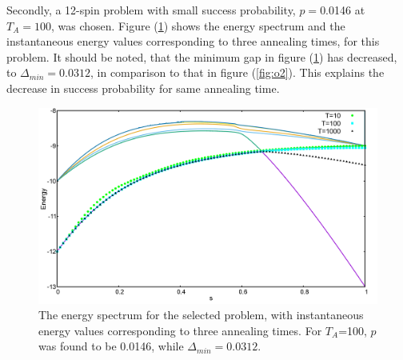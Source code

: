 \documentclass[../main.tex]{subfiles}
\begin{document}
Secondly, a 12-spin problem with small success probability, $p= $0.0146 at $T_A=100$, was chosen. Figure (\ref{fig:o3}) shows the energy spectrum and the instantaneous energy values corresponding to three annealing times, for this problem. It should be noted, that the minimum gap in figure (\ref{fig:o3}) has decreased, to $\Delta_{min} = 0.0312$, in comparison to that in figure (\ref{fig:o2}). This explains the decrease in success probability for same annealing time.\\
\begin{figure}[H]
\centering 
\includegraphics[scale=0.24]{950_s12_O.png}
\caption{The energy spectrum for the selected problem, with instantaneous energy values corresponding to three annealing times. For $T_A$=100, $p$ was found to be 0.0146, while $\Delta_{min}=0.0312.$}
\label{fig:o3}
\end{figure}
\end{document}
